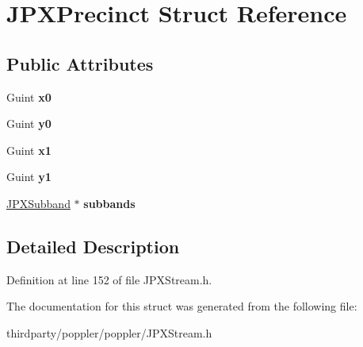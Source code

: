 \hypertarget{struct_j_p_x_precinct}{}\section{J\+P\+X\+Precinct Struct Reference}
\label{struct_j_p_x_precinct}
\subsection*{Public Attributes}
\begin{DoxyCompactItemize}
\item 
\mbox{\label{struct_j_p_x_precinct_aaf83edd96815ad6320f731e5611397eb}} 
Guint {\bfseries x0}
\item 
\mbox{\label{struct_j_p_x_precinct_a8ae94141dc3862b3e56644f995abe530}} 
Guint {\bfseries y0}
\item 
\mbox{\label{struct_j_p_x_precinct_ad03d145c1efdfb480605a73a418bc560}} 
Guint {\bfseries x1}
\item 
\mbox{\label{struct_j_p_x_precinct_ae34b571105c2098e4d459eaf1205543b}} 
Guint {\bfseries y1}
\item 
\mbox{\label{struct_j_p_x_precinct_a487d37b976d989aecbe031d85b29ae58}} 
\hyperlink{struct_j_p_x_subband}{J\+P\+X\+Subband} $\ast$ {\bfseries subbands}
\end{DoxyCompactItemize}


\subsection{Detailed Description}


Definition at line 152 of file J\+P\+X\+Stream.\+h.



The documentation for this struct was generated from the following file\+:\begin{DoxyCompactItemize}
\item 
thirdparty/poppler/poppler/J\+P\+X\+Stream.\+h\end{DoxyCompactItemize}
